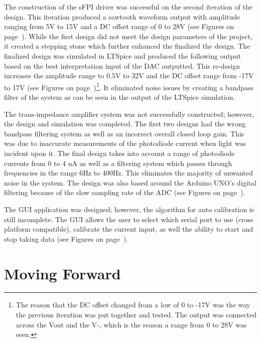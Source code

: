 \documentclass[12pt,journal]{IEEEtran}
\begin{document}
The construction of the sFPI driver was successful on the second iteration of the design. This iteration produced a sawtooth waveform output with amplitude ranging from 5V to 15V and a DC offset range of 0 to 28V (see Figures on page~\pageref{ss:output-signal-graphs}). While the first design did not meet the design parameters of the project, it created a stepping stone which further enhanced the finalized the design. The finalized design was simulated in LTSpice and produced the following output based on the best interpretation input of the DAC outputted. This re-design increases the amplitude range to 0.5V to 32V and the DC offset range from -17V to 17V (see Figures on page~\pageref{subss:final-design-output})\footnote{The reason that the DC offset changed from a low of 0 to -17V was the way the previous iteration was put together and tested. The output was connected across the Vout and the V-, which is the reason a range from 0 to 28V was seen.}. It eliminated noise issues by creating a bandpass filter of the system as can be seen in the output of the LTSpice simulation.  

The trans-impedance amplifier system was not successfully constructed; however, the design and simulation was completed. The first two designs had the wrong bandpass filtering system as well as an incorrect overall closed loop gain. This was due to inaccurate measurements of the photodiode current when light was incident upon it. The final design takes into account a range of photodiode currents from 0 to 4 nA as well as a filtering system which passes through frequencies in the range 6Hz to 400Hz. This eliminates the majority of unwanted noise in the system. The design was also based around the Arduino UNO's digital filtering because of the slow sampling rate of the ADC (see Figures on page~\pageref{subss:trans-amp-output}).

The GUI application was designed; however, the algorithm for auto calibration is still incomplete. The GUI allows the user to select which serial port to use (cross platform compatible), calibrate the current input, as well the ability to start and stop taking data (see Figures on page~\pageref{subss:GUI}).   


\section{Moving Forward}
\end{document}
